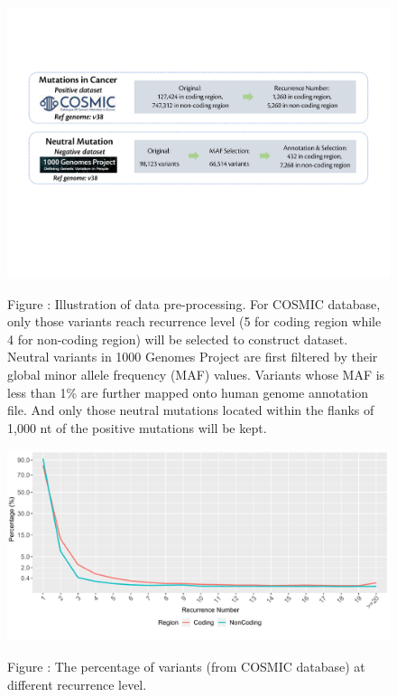 \documentclass[a4paper,nohyper,nobib,openany,justified]{tufte-book}
\begin{document}
\begin{fullwidth}
\begin{figure}[b!]
  \includegraphics[width=\linewidth]{DataProcess.pdf}%

  \smallskip\noindent\small Figure \thefigure:
Illustration of data pre-processing. For COSMIC database, only those variants reach recurrence level (5 for coding region while 4 for non-coding region) will be selected to construct dataset. Neutral variants in 1000 Genomes Project are first filtered by their global minor allele frequency (MAF) values. Variants whose MAF is less than 1\% are further mapped onto human genome annotation file. And only those neutral mutations located within the flanks of 1,000 nt of the positive mutations will be kept.
  \label{fig:dataset}%
\end{figure}

\begin{figure}[t]
  \includegraphics[width=\linewidth]{RecurrenceNumber.pdf}%

  \smallskip\noindent\small Figure \thefigure:
The percentage of variants (from COSMIC database) at different recurrence level.
  \label{fig:recurrenceNum}%
\end{figure}


\end{fullwidth}
\end{document}
